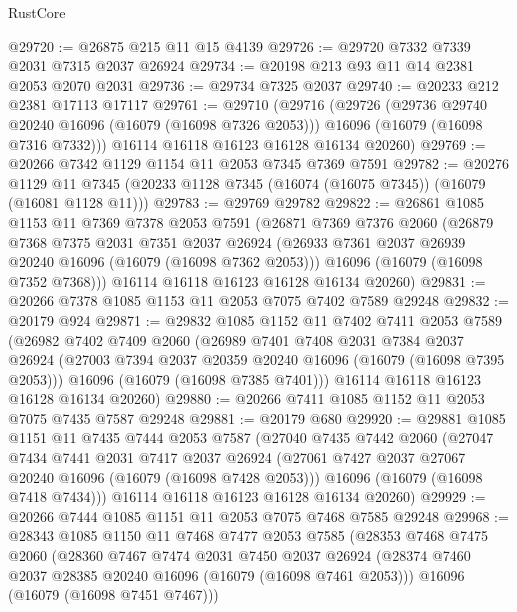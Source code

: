\begin{lexlean}{RustCore}
\begin{coremodule}
@29720 := @26875 @215 @11 @15 @4139
@29726 := @29720 @7332 @7339 @2031 @7315 @2037 @26924
@29734 := @20198 @213 @93 @11 @14 @2381 @2053 @2070 @2031
@29736 := @29734 @7325 @2037
@29740 := @20233 @212 @2381 @17113 @17117
@29761 := @29710
    (@29716
      (@29726
        (@29736 @29740 @20240 @16096 (@16079 (@16098 @7326 @2053)))
        @16096
        (@16079 (@16098 @7316 @7332)))
      @16114
      @16118
      @16123
      @16128
      @16134
      @20260)
@29769 := @20266 @7342 @1129 @1154 @11 @2053 @7345 @7369 @7591
@29782 := @20276
    @1129
    @11
    @7345
    (@20233 @1128 @7345 (@16074 (@16075 @7345)) (@16079 (@16081 @1128 @11)))
@29783 := @29769 @29782
@29822 := @26861
    @1085
    @1153
    @11
    @7369
    @7378
    @2053
    @7591
    (@26871
      @7369
      @7376
      @2060
      (@26879
        @7368
        @7375
        @2031
        @7351
        @2037
        @26924
        (@26933 @7361 @2037 @26939 @20240 @16096 (@16079 (@16098 @7362 @2053)))
        @16096
        (@16079 (@16098 @7352 @7368)))
      @16114
      @16118
      @16123
      @16128
      @16134
      @20260)
@29831 := @20266 @7378 @1085 @1153 @11 @2053 @7075 @7402 @7589 @29248
@29832 := @20179 @924
@29871 := @29832
    @1085
    @1152
    @11
    @7402
    @7411
    @2053
    @7589
    (@26982
      @7402
      @7409
      @2060
      (@26989
        @7401
        @7408
        @2031
        @7384
        @2037
        @26924
        (@27003 @7394 @2037 @20359 @20240 @16096 (@16079 (@16098 @7395 @2053)))
        @16096
        (@16079 (@16098 @7385 @7401)))
      @16114
      @16118
      @16123
      @16128
      @16134
      @20260)
@29880 := @20266 @7411 @1085 @1152 @11 @2053 @7075 @7435 @7587 @29248
@29881 := @20179 @680
@29920 := @29881
    @1085
    @1151
    @11
    @7435
    @7444
    @2053
    @7587
    (@27040
      @7435
      @7442
      @2060
      (@27047
        @7434
        @7441
        @2031
        @7417
        @2037
        @26924
        (@27061 @7427 @2037 @27067 @20240 @16096 (@16079 (@16098 @7428 @2053)))
        @16096
        (@16079 (@16098 @7418 @7434)))
      @16114
      @16118
      @16123
      @16128
      @16134
      @20260)
@29929 := @20266 @7444 @1085 @1151 @11 @2053 @7075 @7468 @7585 @29248
@29968 := @28343
    @1085
    @1150
    @11
    @7468
    @7477
    @2053
    @7585
    (@28353
      @7468
      @7475
      @2060
      (@28360
        @7467
        @7474
        @2031
        @7450
        @2037
        @26924
        (@28374 @7460 @2037 @28385 @20240 @16096 (@16079 (@16098 @7461 @2053)))
        @16096
        (@16079 (@16098 @7451 @7467)))

\end{coremodule}
\end{lexlean}
